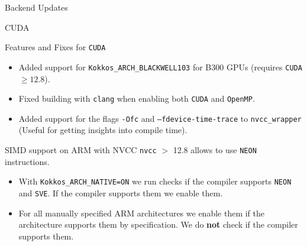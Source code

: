 
\begin{frame}[fragile]

  {\Huge Backend Updates}

  \vspace{10pt}

\end{frame}


\begin{frame}[fragile]

  {\Huge CUDA}

  \vspace{10pt}

\end{frame}

\begin{frame}[fragile]{Features and Fixes for \texttt{CUDA}}

  \begin{itemize}
    \item Added support for \texttt{Kokkos\_ARCH\_BLACKWELL103} for B300 GPUs (requires \texttt{CUDA} $\geq 12.8$).
    \item Fixed building with \texttt{clang} when enabling both \texttt{CUDA} and \texttt{OpenMP}.
    \item Added support for the flags \texttt{-Ofc} and \texttt{--fdevice-time-trace} to \texttt{nvcc\_wrapper} (Useful for getting insights into compile time).
  \end{itemize}

\end{frame}

\begin{frame}[fragile]{SIMD support on ARM with NVCC}
  \texttt{nvcc} $>$ 12.8 allows to use \texttt{NEON} instructions.
  \begin{itemize}
    \item With \texttt{Kokkos\_ARCH\_NATIVE=ON} we run checks if the compiler supports \texttt{NEON} and \texttt{SVE}. If the compiler supports them we enable them.
    \item For all manually specified ARM architectures we enable them if the architecture supports them by specification. We do \textbf{not} check if the compiler supports them.
  \end{itemize}
\end{frame}

